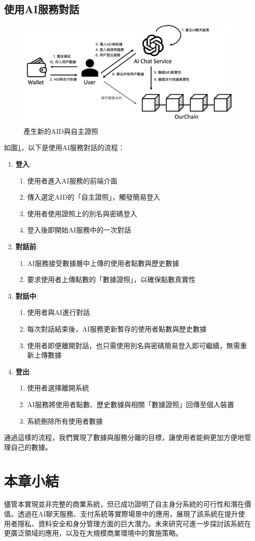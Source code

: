\subsection{使用AI服務對話}
\begin{figure}
  \centering
  \includegraphics[width=\linewidth, keepaspectratio]{figures/implement-3.png}
  \caption{產生新的AID與自主證照}
  \label{fig:implement-3}
\end{figure}
如圖\ref{fig:implement-3}，以下是使用AI服務對話的流程：
\begin{enumerate}
  \item \textbf{登入}:
        \begin{enumerate}
          \item 使用者進入AI服務的前端介面
          \item 傳入選定AID的「自主證照」，觸發簡易登入
          \item 使用者使用證照上的別名與密碼登入
          \item 登入後即開始AI服務中的一次對話
        \end{enumerate}
  \item \textbf{對話前}:
        \begin{enumerate}
          \item AI服務接受數據層中上傳的使用者點數與歷史數據
          \item 要求使用者上傳點數的「數據證照」，以確保點數真實性
        \end{enumerate}
  \item \textbf{對話中}:
        \begin{enumerate}
          \item 使用者與AI進行對話
          \item 每次對話結束後，AI服務更新暫存的使用者點數與歷史數據
          \item 使用者即便離開對話，也只需使用別名與密碼簡易登入即可繼續，無需重新上傳數據
        \end{enumerate}
  \item \textbf{登出}:
        \begin{enumerate}
          \item 使用者選擇離開系統
          \item AI服務將使用者點數、歷史數據與相關「數據證照」回傳至個人裝置
          \item 系統刪除所有使用者數據
        \end{enumerate}
\end{enumerate}
通過這樣的流程，我們實現了數據與服務分離的目標，讓使用者能夠更加方便地管理自己的數據。
\section{本章小結}
儘管本實現並非完整的商業系統，但已成功證明了自主身分系統的可行性和潛在價值。透過在AI聊天服務、支付系統等實際場景中的應用，展現了該系統在提升使用者隱私、資料安全和身分管理方面的巨大潛力。未來研究可進一步探討該系統在更廣泛領域的應用，以及在大規模商業環境中的實施策略。